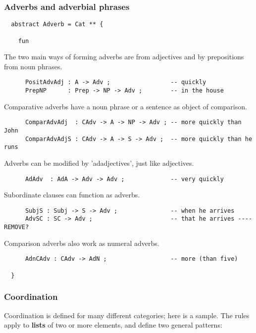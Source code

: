 \documentclass[11pt,a4paper]{article}
\newcommand{\commOut}[1]{}
\begin{document}
\subsubsection{Adverbs and adverbial phrases}
\begin{verbatim}
  abstract Adverb = Cat ** {
  
    fun
\end{verbatim}

The two main ways of forming adverbs are from adjectives and by
prepositions from noun phrases.

\begin{verbatim}
      PositAdvAdj : A -> Adv ;                 -- quickly
      PrepNP      : Prep -> NP -> Adv ;        -- in the house
\end{verbatim}

Comparative adverbs have a noun phrase or a sentence as object of
comparison.

\begin{verbatim}
      ComparAdvAdj  : CAdv -> A -> NP -> Adv ; -- more quickly than John
      ComparAdvAdjS : CAdv -> A -> S -> Adv ;  -- more quickly than he runs
\end{verbatim}

Adverbs can be modified by 'adadjectives', just like adjectives.

\begin{verbatim}
      AdAdv  : AdA -> Adv -> Adv ;             -- very quickly
\end{verbatim}

Subordinate clauses can function as adverbs.

\begin{verbatim}
      SubjS : Subj -> S -> Adv ;               -- when he arrives
      AdvSC : SC -> Adv ;                      -- that he arrives ---- REMOVE?
\end{verbatim}

Comparison adverbs also work as numeral adverbs.

\begin{verbatim}
      AdnCAdv : CAdv -> AdN ;                  -- more (than five)
  
  }
\end{verbatim}

\commOut{Produced by 
gfdoc - a rudimentary GF document generator.
(c) Aarne Ranta (\htmladdnormallink{aarne@cs.chalmers.se}{mailto:aarne@cs.chalmers.se}) 2002 under GNU GPL.}


\subsubsection{Coordination}
Coordination is defined for many different categories; here is
a sample. The rules apply to \textbf{lists} of two or more elements,
and define two general patterns: 
\end{document}
